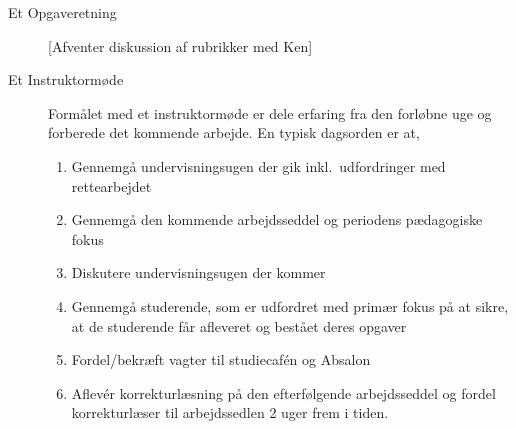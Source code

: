 \documentclass[a4paper]{article}
\begin{document}
\begin{description}
\item[Et Opgaveretning] [Afventer diskussion af rubrikker med Ken]

\item[Et Instruktormøde] Formålet med et instruktormøde er dele
  erfaring fra den forløbne uge og forberede det kommende
  arbejde. En typisk dagsorden er at,
  \begin{enumerate}
  \item Gennemgå undervisningsugen der gik inkl.\ udfordringer med rettearbejdet
  \item Gennemgå den kommende arbejdsseddel og periodens pædagogiske
    fokus
  \item Diskutere undervisningsugen der kommer
  \item Gennemgå studerende, som er udfordret med primær fokus på at
    sikre, at de studerende får afleveret og bestået deres opgaver
  \item Fordel/bekræft vagter til studiecaf{\'e}n og Absalon
  \item Aflev{\'e}r korrekturlæsning på den efterfølgende
    arbejdsseddel og fordel korrekturlæser til arbejdssedlen 2 uger
    frem i tiden.
  \end{enumerate}
\end{description}
\end{document}

